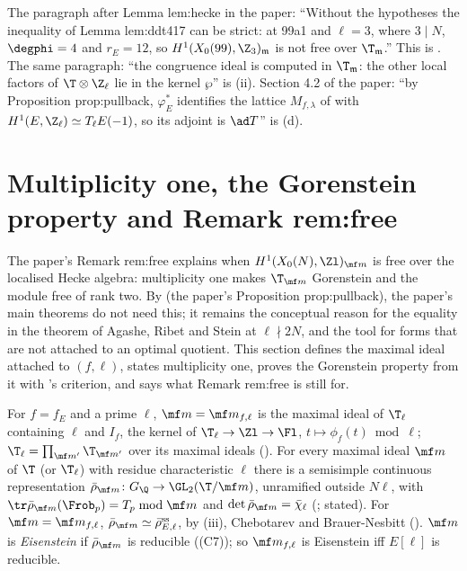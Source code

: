 \begin{paperlink}\label{pl:moddeg:lem-hecke}
The paragraph after Lemma lem:hecke in the paper: ``Without the hypotheses the inequality of Lemma lem:ddt417 can be strict: at 99a1 and $\ell=3$, where $3\mid N$,
$\degphi=4$ and $r_E=12$, so $H^1(X_0(99),\Z_3)_{\mathfrak m}$ is not free over $\T_{\mathfrak m}$.'' This is . The same paragraph: ``the congruence ideal is computed in
$\T_{\mathfrak m}$: the other local factors of $\T\otimes\Z_\ell$ lie in the kernel $\wp$'' is (ii). Section 4.2 of the paper: ``by Proposition prop:pullback,
$\varphi_E^*$ identifies the lattice $M_{f,\lambda}$ of \cite{DFG04} with $H^1(E,\Z_\ell)\simeq T_\ell E(-1)$, so its adjoint is $\ad T$'' is (d).
\end{paperlink}

\section[Multiplicity one and the Gorenstein property]{Multiplicity one, the Gorenstein property and Remark rem:free}\label{sec:moddeg:mult-one}

The paper's Remark rem:free explains when $H^1(X_0(N),\Zl)_{\mf m}$ is free over the localised Hecke algebra: multiplicity one makes $\T_{\mf m}$ Gorenstein and the module free of rank two. By
 (the paper's Proposition prop:pullback), the paper's main theorems do not need this; it remains the conceptual reason for the equality in the theorem of Agashe, Ribet and Stein at $\ell\nmid2N$, and the
tool for forms that are not attached to an optimal quotient. This section defines the maximal ideal attached to $(f,\ell)$, states multiplicity one, proves the Gorenstein property from it
with 's criterion, and says what Remark rem:free is still for.

\begin{definition}\label{def:moddeg:maximal-ideal}
For $f=f_E$ and a prime $\ell$, $\mf m=\mf m_{f,\ell}$ is the maximal ideal of $\T_\ell$ containing $\ell$ and $I_f$, the kernel of $\T_\ell\to\Zl\to\Fl$, $t\mapsto\phi_f(t)\bmod\ell$; $\T_\ell=\prod_{\mf m'}\T_{\mf m'}$ over
its maximal ideals (). For every maximal ideal $\mf m$ of $\T$ (or $\T_\ell$) with residue characteristic $\ell$ there is a semisimple continuous representation
$\bar\rho_{\mf m}\colon G_\Q\to\GL_2(\T/\mf m)$, unramified outside $N\ell$, with $\tr\bar\rho_{\mf m}(\Frob_p)=T_p\bmod\mf m$ and $\det\bar\rho_{\mf m}=\bar\chi_\ell$ (; stated). For
$\mf m=\mf m_{f,\ell}$, $\bar\rho_{\mf m}\simeq\bar\rho_{E,\ell}^{\mathrm{ss}}$, by (iii), Chebotarev and Brauer-Nesbitt (). $\mf m$ is
\emph{Eisenstein} if $\bar\rho_{\mf m}$ is reducible ((C7)); so $\mf m_{f,\ell}$ is Eisenstein iff $E[\ell]$ is reducible.
\end{definition}

